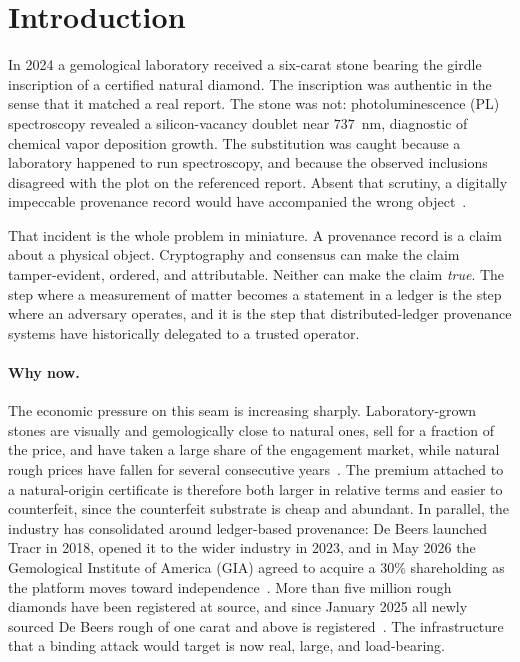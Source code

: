 \documentclass[10pt,twocolumn]{article}
\theoremstyle{remark}
\begin{document}
\begin{abstract}
We argue that unforgeability in the absolute sense is unattainable, and that the
achievable goal is a reduction: forgery becomes equivalent to atomic-scale
replication of a defect constellation, compromise of an attested instrument, or
possession of the genuine stone, with each made detectable and attributable. All
evaluation is simulation on synthetic data; we specify the physical study with
graded stones that would validate or refute it.
\end{abstract}

\vspace{0.6em}

\section{Introduction}

In 2024 a gemological laboratory received a six-carat stone bearing the girdle
inscription of a certified natural diamond. The inscription was authentic in the
sense that it matched a real report. The stone was not: photoluminescence (PL)
spectroscopy revealed a silicon-vacancy doublet near $737$~nm, diagnostic of
chemical vapor deposition growth. The substitution was caught because a
laboratory happened to run spectroscopy, and because the observed inclusions
disagreed with the plot on the referenced report. Absent that scrutiny, a
digitally impeccable provenance record would have accompanied the wrong
object~\cite{igi2024}.

That incident is the whole problem in miniature. A provenance record is a claim
about a physical object. Cryptography and consensus can make the claim
tamper-evident, ordered, and attributable. Neither can make the claim
\emph{true}. The step where a measurement of matter becomes a statement in a
ledger is the step where an adversary operates, and it is the step that
distributed-ledger provenance systems have historically delegated to a trusted
operator.

\paragraph{Why now.} The economic pressure on this seam is increasing sharply.
Laboratory-grown stones are visually and gemologically close to natural ones,
sell for a fraction of the price, and have taken a large share of the
engagement market, while natural rough prices have fallen for several
consecutive years~\cite{tnw2026}. The premium attached to a natural-origin
certificate is therefore both larger in relative terms and easier to
counterfeit, since the counterfeit substrate is cheap and abundant. In parallel,
the industry has consolidated around ledger-based provenance: De Beers launched
Tracr in 2018, opened it to the wider industry in 2023, and in May 2026 the
Gemological Institute of America (GIA) agreed to acquire a $30\%$ shareholding
as the platform moves toward independence~\cite{gia2026,debeers2026}. More than
five million rough diamonds have been registered at source, and since January
2025 all newly sourced De Beers rough of one carat and above is
registered~\cite{gia2026}. The infrastructure that a binding attack would target
is now real, large, and load-bearing.
\end{document}
